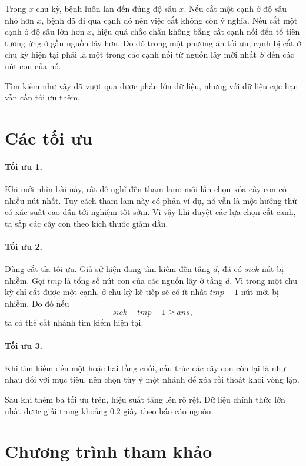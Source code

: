 \documentclass[11pt]{article}
\begin{document}
Trong \(x\) chu kỳ, bệnh luôn lan đến đúng độ sâu \(x\). Nếu cắt một cạnh ở
độ sâu nhỏ hơn \(x\), bệnh đã đi qua cạnh đó nên việc cắt không còn ý nghĩa.
Nếu cắt một cạnh ở độ sâu lớn hơn \(x\), hiệu quả chắc chắn không bằng cắt
cạnh nối đến tổ tiên tương ứng ở gần nguồn lây hơn. Do đó trong một phương án
tối ưu, cạnh bị cắt ở chu kỳ hiện tại phải là một trong các cạnh nối từ nguồn
lây mới nhất \(S\) đến các nút con của nó.

Tìm kiếm như vậy đã vượt qua được phần lớn dữ liệu, nhưng với dữ liệu cực hạn
vẫn cần tối ưu thêm.

\section{Các tối ưu}

\paragraph{Tối ưu 1.}
Khi mới nhìn bài này, rất dễ nghĩ đến tham lam: mỗi lần chọn xóa cây con có
nhiều nút nhất. Tuy cách tham lam này có phản ví dụ, nó vẫn là một hướng thử
có xác suất cao dẫn tới nghiệm tốt sớm. Vì vậy khi duyệt các lựa chọn cắt
cạnh, ta sắp các cây con theo kích thước giảm dần.

\paragraph{Tối ưu 2.}
Dùng cắt tỉa tối ưu. Giả sử hiện đang tìm kiếm đến tầng \(d\), đã có
\(\mathit{sick}\) nút bị nhiễm. Gọi \(\mathit{tmp}\) là tổng số nút con của
các nguồn lây ở tầng \(d\). Vì trong một chu kỳ chỉ cắt được một cạnh, ở chu
kỳ kế tiếp sẽ có ít nhất \(\mathit{tmp}-1\) nút mới bị nhiễm. Do đó nếu
\[
  \mathit{sick}+\mathit{tmp}-1\ge \mathit{ans},
\]
ta có thể cắt nhánh tìm kiếm hiện tại.

\paragraph{Tối ưu 3.}
Khi tìm kiếm đến một hoặc hai tầng cuối, cấu trúc các cây con còn lại là như
nhau đối với mục tiêu, nên chọn tùy ý một nhánh để xóa rồi thoát khỏi vòng
lặp.

Sau khi thêm ba tối ưu trên, hiệu suất tăng lên rõ rệt. Dữ liệu chính thức lớn
nhất được giải trong khoảng \(0.2\) giây theo báo cáo nguồn.

\section{Chương trình tham khảo}
\end{document}
